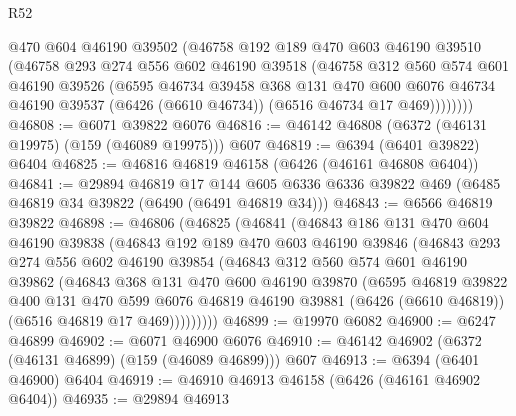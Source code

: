 \begin{lexlean}{R52}
\begin{coremodule}
          @470
          @604
          @46190
          @39502
          (@46758
            @192
            @189
            @470
            @603
            @46190
            @39510
            (@46758
              @293
              @274
              @556
              @602
              @46190
              @39518
              (@46758
                @312
                @560
                @574
                @601
                @46190
                @39526
                (@6595
                  @46734
                  @39458
                  @368
                  @131
                  @470
                  @600
                  @6076
                  @46734
                  @46190
                  @39537
                  (@6426 (@6610 @46734))
                  (@6516 @46734 @17 @469))))))))
@46808 := @6071 @39822 @6076
@46816 := @46142 @46808 (@6372 (@46131 @19975) (@159 (@46089 @19975))) @607
@46819 := @6394 (@6401 @39822) @6404
@46825 := @46816 @46819 @46158 (@6426 (@46161 @46808 @6404))
@46841 := @29894
    @46819
    @17
    @144
    @605
    @6336
    @6336
    @39822
    @469
    (@6485 @46819 @34 @39822 (@6490 (@6491 @46819 @34)))
@46843 := @6566 @46819 @39822
@46898 := @46806
    (@46825
      (@46841
        (@46843
          @186
          @131
          @470
          @604
          @46190
          @39838
          (@46843
            @192
            @189
            @470
            @603
            @46190
            @39846
            (@46843
              @293
              @274
              @556
              @602
              @46190
              @39854
              (@46843
                @312
                @560
                @574
                @601
                @46190
                @39862
                (@46843
                  @368
                  @131
                  @470
                  @600
                  @46190
                  @39870
                  (@6595
                    @46819
                    @39822
                    @400
                    @131
                    @470
                    @599
                    @6076
                    @46819
                    @46190
                    @39881
                    (@6426 (@6610 @46819))
                    (@6516 @46819 @17 @469)))))))))
@46899 := @19970 @6082
@46900 := @6247 @46899
@46902 := @6071 @46900 @6076
@46910 := @46142 @46902 (@6372 (@46131 @46899) (@159 (@46089 @46899))) @607
@46913 := @6394 (@6401 @46900) @6404
@46919 := @46910 @46913 @46158 (@6426 (@46161 @46902 @6404))
@46935 := @29894
    @46913

\end{coremodule}
\end{lexlean}

